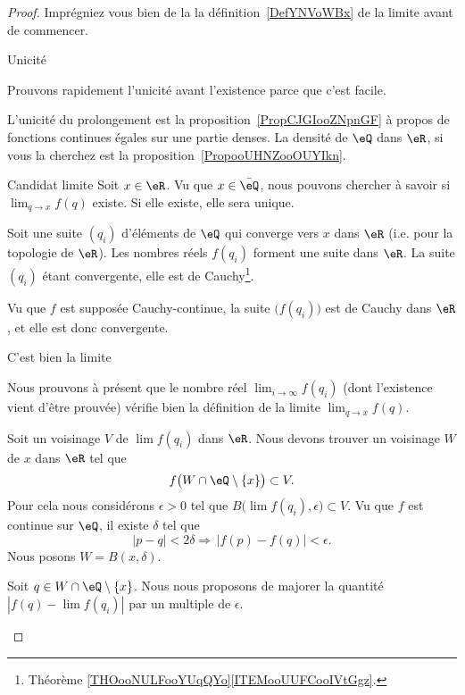 \begin{proof}
	Imprégniez vous bien de la la définition~\ref{DefYNVoWBx} de la limite avant de commencer.

	\begin{subproof}

		\item[Unicité]

		Prouvons rapidement l'unicité avant l'existence parce que c'est facile.

		L'unicité du prolongement est la proposition~\ref{PropCJGIooZNpnGF} à propos de fonctions continues égales sur une partie denses. La densité de \( \eQ\) dans \( \eR\), si vous la cherchez est la proposition~\ref{PropooUHNZooOUYIkn}.

		\item[Candidat limite]
		Soit \( x\in \eR\). Vu que \( x\in \bar \eQ\), nous pouvons chercher à savoir si \( \lim_{q\to x} f(q) \) existe. Si elle existe, elle sera unique.

		Soit une suite \( (q_i)\) d'éléments de \( \eQ\) qui converge vers \( x\) dans \( \eR\) (i.e. pour la topologie de \( \eR\)). Les nombres réels \( f(q_i)\) forment une suite dans \( \eR\). La suite \( (q_i)\) étant convergente, elle est de Cauchy\footnote{Théorème \ref{THOooNULFooYUqQYo}\ref{ITEMooUUFCooIVtGgz}.}.

		Vu que \( f\) est supposée Cauchy-continue, la suite \(\big( f(q_i) \big)\) est de Cauchy dans \( \eR\), et elle est donc convergente.
		\item[C'est bien la limite]

		Nous prouvons à présent que le nombre réel \( \lim_{i\to \infty} f(q_i)\) (dont l'existence vient d'être prouvée) vérifie bien la définition de la limite \( \lim_{q\to x}f(q)\).

		Soit un voisinage \( V\) de \( \lim f(q_i)\) dans \( \eR\). Nous devons trouver un voisinage \( W\) de \( x\) dans \( \eR\) tel que
		\begin{equation}
			f\big( W\cap\eQ\setminus\{ x \} \big)\subset V.
		\end{equation}
		Pour cela nous considérons \( \epsilon>0\) tel que \( B\big( \lim f(q_i),\epsilon \big)\subset V\). Vu que \( f\) est continue sur \( \eQ\), il existe \( \delta\) tel que
		\begin{equation}
			| p-q |<2\delta\Rightarrow\,| f(p)-f(q) |<\epsilon.
		\end{equation}
		Nous posons \( W=B(x,\delta)\).

		Soit \( q\in W\cap\eQ\setminus\{ x \}\). Nous nous proposons de majorer la quantité $| f(q)-\lim f(q_i) |$ par un multiple de \( \epsilon\).


\end{subproof}
\end{proof}
